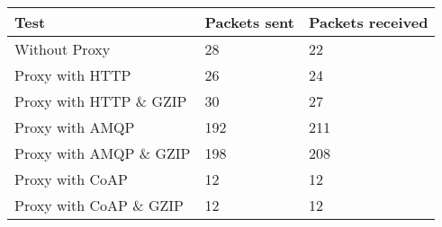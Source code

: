 \begin{tabular}{|l|l|l|}
\hline
\textbf{Test} & \textbf{Packets sent} & \textbf{Packets received} \\ \hline
Without Proxy                    &28         & 22        \\ \hline 
Proxy with HTTP                  &26         & 24        \\ \hline 
Proxy with HTTP \& GZIP          &30         & 27        \\ \hline 
Proxy with AMQP                  &192        & 211       \\ \hline 
Proxy with AMQP \& GZIP          &198        & 208       \\ \hline 
Proxy with CoAP                  &12         & 12        \\ \hline 
Proxy with CoAP \& GZIP          &12         & 12        \\ \hline 
\end{tabular}